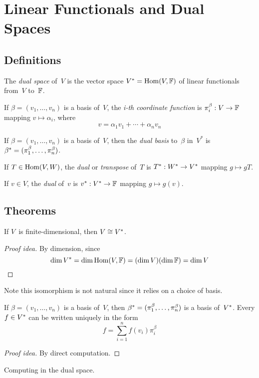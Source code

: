 %
%
%
\section{Linear Functionals and Dual Spaces}
\subsection*{Definitions}
\begin{defn}
The \emph{dual space} of~\(V\) is the vector space \({V}^*=\operatorname{Hom}(V,\mathbb{F})\) of linear functionals from~\(V\) to~\(\mathbb{F}\).
\end{defn}
\begin{defn}
If \(\beta=(v_1,\ldots,v_n)\) is a basis of~\(V\), the \emph{i-th coordinate function} is \(\pi_i^{\beta}:V\to\mathbb{F}\) mapping \(v\mapsto\alpha_i\), where
\[v=\alpha_1v_1+\cdots+\alpha_nv_n\]
\end{defn}
\begin{defn}
If \(\beta=(v_1,\ldots,v_n)\) is a basis of~\(V\), then the \emph{dual basis} to~\(\beta\) in~\(V^*\) is \({\beta}^*=(\pi_1^{\beta},\ldots,\pi_n^{\beta})\).
\end{defn}
\begin{defn}
If \(T\in\operatorname{Hom}(V,W)\), the \emph{dual} or \emph{transpose} of~\(T\) is \({T}^*:{W}^*\to{V}^*\) mapping \(g\mapsto gT\).
\end{defn}
\begin{defn}
If \(v\in V\), the \emph{dual} of~\(v\) is \({v}^*:{V}^*\to\mathbb{F}\) mapping \(g\mapsto g(v)\).
\end{defn}
\subsection*{Theorems}
\begin{thm}
If \(V\)~is finite-dimensional, then \(V\cong{V}^*\).
\end{thm}
\begin{proof}[Proof idea]
By dimension, since
\[\dim{V}^*=\dim\operatorname{Hom}(V,\mathbb{F})=(\dim V)(\dim\mathbb{F})=\dim V\qedhere\]
\end{proof}
\begin{rmk}
Note this isomorphism is not natural since it relies on a choice of basis.
\end{rmk}

\begin{thm}
If \(\beta=(v_1,\ldots,v_n)\) is a basis of~\(V\), then \({\beta}^*=(\pi_1^{\beta},\ldots,\pi_n^{\beta})\) is a basis of~\({V}^*\). Every \(f\in{V}^*\) can be written uniquely in the form
\[f=\sum_{i=1}^nf(v_i)\pi_i^{\beta}\]
\end{thm}
\begin{proof}[Proof idea]
By direct computation.
\end{proof}
\begin{app}
Computing in the dual space.
\end{app}

